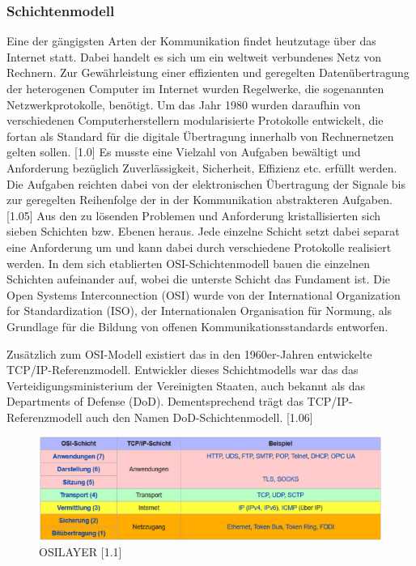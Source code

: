 \subsubsection{Schichtenmodell}

Eine der gängigsten Arten der Kommunikation findet heutzutage über das Internet statt. Dabei handelt es sich um ein weltweit verbundenes Netz von Rechnern. Zur Gewährleistung einer effizienten und geregelten Datenübertragung der heterogenen Computer im Internet wurden Regelwerke, die sogenannten Netzwerkprotokolle, benötigt. Um das Jahr 1980 wurden daraufhin von verschiedenen Computerherstellern modularisierte Protokolle entwickelt, die fortan als Standard für die digitale Übertragung innerhalb von Rechnernetzen gelten sollen. [1.0] Es musste eine Vielzahl von Aufgaben bewältigt und Anforderung bezüglich Zuverlässigkeit, Sicherheit, Effizienz etc. erfüllt werden. Die Aufgaben reichten dabei von der elektronischen Übertragung der Signale bis zur geregelten Reihenfolge der in der Kommunikation abstrakteren Aufgaben.  [1.05] Aus den zu lösenden Problemen und Anforderung kristallisierten sich sieben Schichten bzw. Ebenen heraus. Jede einzelne Schicht setzt dabei separat eine Anforderung um und kann dabei durch verschiedene Protokolle realisiert werden. In dem sich etablierten OSI-Schichtenmodell bauen die einzelnen Schichten aufeinander auf, wobei die unterste Schicht das Fundament ist. Die Open Systems Interconnection (OSI) wurde von der International Organization for Standardization (ISO), der Internationalen Organisation für Normung, als Grundlage für die Bildung von offenen Kommunikationsstandards entworfen. 
\newline

Zusätzlich zum OSI-Modell existiert das in den 1960er-Jahren entwickelte TCP/IP-Referenzmodell. Entwickler dieses Schichtmodells war das das Verteidigungsministerium der Vereinigten Staaten, auch bekannt als das Departments of Defense (DoD). Dementsprechend trägt das TCP/IP-Referenzmodell auch den Namen DoD-Schichtenmodell. [1.06]

\begin{figure}[h]
\centering
\includegraphics[width=\textwidth]{images/Netzwerkprotokolle_OSI-Schicht.PNG}
\caption{OSILAYER [1.1]}
\end{figure}

